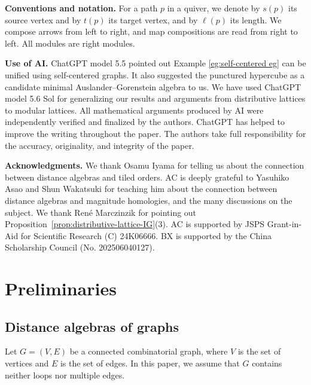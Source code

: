 \documentclass[a4paper,leqno]{amsart}
\begin{document}
\medskip
\noindent
{\bf Conventions and notation.}
For a path $p$ in a quiver, we denote by $s(p)$ its source vertex and by $t(p)$ its target vertex, and by $\ell(p)$ its length. We compose arrows from left to right, and map compositions are read from right to left. All modules are right modules.


\medskip
\noindent
\textbf{Use of AI.}
ChatGPT model 5.5 pointed out Example \ref{eg:self-centered eg} can be unified using self-centered graphs.  It also suggested the punctured hypercube as a candidate minimal Auslander--Gorenstein algebra to us.  We have used ChatGPT model 5.6 Sol for generalizing our results and arguments from distributive lattices to modular lattices.
All mathematical arguments produced by AI were independently verified and finalized by the authors. 
ChatGPT has helped to improve the writing throughout the paper.  
The authors take full responsibility for the accuracy, originality, and integrity of the paper.

\medskip
\noindent
\textbf{Acknowledgments.}
We thank Osamu Iyama for telling us about the connection between distance algebras and tiled orders.  AC is deeply grateful to Yasuhiko Asao and Shun Wakatsuki for teaching him about the connection between distance algebras and magnitude homologies, and the many discussions on the subject.
We thank Ren\'{e} Marczinzik for pointing out Proposition~\ref{prop:distributive-lattice-IG}(3).
AC is supported by JSPS Grant-in-Aid for Scientific Research (C) 24K06666. BX is supported by the China Scholarship Council (No. 202506040127).

\section{Preliminaries}\label{sec:2}

\subsection{Distance algebras of graphs} 

Let $G=(V,E)$ be a connected combinatorial graph, where $V$ is the set of vertices and $E$ is the set of edges. In this paper, we assume that $G$ contains neither loops nor multiple edges.
\end{document}
